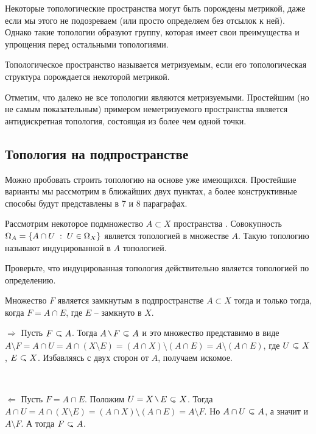    Некоторые топологические пространства могут быть порождены метрикой, даже если мы этого не подозреваем (или просто определяем без отсылок к ней). Однако такие топологии образуют группу, которая имеет свои преимущества и упрощения перед остальными топологиями.

   \begin{Def}
       Топологическое пространство называется метризуемым, если его топологическая структура порождается некоторой метрикой.
   \end{Def}

   \begin{Note}
       Отметим, что далеко не все топологии являются метризуемыми. Простейшим (но не самым показательным) примером неметризуемого пространства является антидискретная топология, состоящая из более чем одной точки.
   \end{Note}
   \subsection{Топология на подпространстве}
   Можно пробовать строить топологию на основе уже имеющихся. Простейшие варианты мы рассмотрим в ближайших двух пунктах, а более конструктивные способы будут представлены в 7 и 8 параграфах. 
   \begin{Def}
   Рассмотрим некоторое подмножество $A\subset X$ пространства \topX. Совокупность  $\Omega_A = \left\{ A \cap U \; : \; U \in \Omega_X \right\}$ является топологией в множестве $A$. Такую топологию называют индуцированной в $A$ топологией.
   \end{Def}
    \begin{Task}
        Проверьте, что индуцированная топология действительно является топологией по определению.
    \end{Task}

    \begin{Prop}
        Множество $F$ является замкнутым в подпространстве $A\subset X$ тогда и только тогда, когда $F = A \cap E$, где $E$ -- замкнуто в $X$.
    \end{Prop}
    \begin{Proof}
        $\Rightarrow$ Пусть $F \closed A$. Тогда $A\setminus F \open A$ и это  множество представимо в виде $A \setminus F = A \cap U = A \cap (X \setminus E) = (A \cap X) \setminus (A \cap E) = A \setminus (A\cap E)$, где $U \open X$, $E \closed X$. Избавляясь с двух сторон от $A$, получаем искомое.

        \

        \noindent$\Leftarrow$ Пусть $F = A\cap E$. Положим $U = X \setminus E \open X$. Тогда $A \cap U = A \cap (X\setminus E) = (A\cap X) \setminus (A \cap E) = A \setminus F$. Но $A \cap U \open A$, а значит и $A \setminus F$. А тогда $F \closed A$.
    \end{Proof}
    
